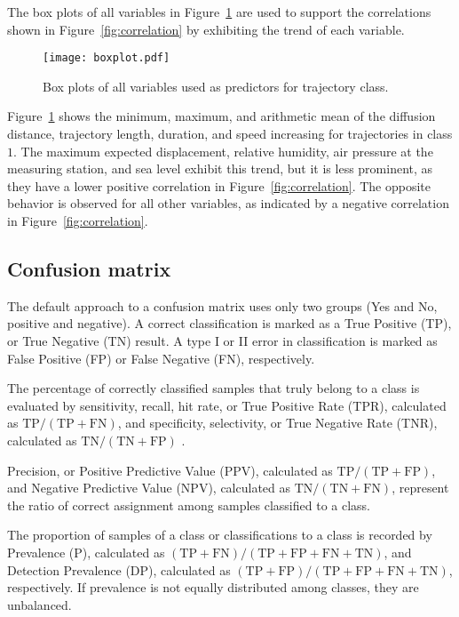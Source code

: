 \let\LaTeXcline\cline\documentclass[sn-mathphys-num]{sn-jnl}\let\cline\LaTeXcline
\begin{document}
The box plots of all variables in Figure~\ref{fig:iono3boxplot} are used to support the correlations shown in Figure~\ref{fig:correlation} by exhibiting the trend of each variable.

\begin{figure}[!ht]
    \centering
    \texttt{[image: boxplot.pdf]}
    \caption{Box plots of all variables used as predictors for trajectory class.}
    \label{fig:iono3boxplot}
\end{figure}

Figure~\ref{fig:iono3boxplot} shows the minimum, maximum, and arithmetic mean of the diffusion distance, trajectory length, duration, and speed increasing for trajectories in class $1$. The maximum expected displacement, relative humidity, air pressure at the measuring station, and sea level exhibit this trend, but it is less prominent, as they have a lower positive correlation in Figure~\ref{fig:correlation}. The opposite behavior is observed for all other variables, as indicated by a negative correlation in Figure~\ref{fig:correlation}.

\subsection{Confusion matrix}

The default approach to a confusion matrix uses only two groups (Yes and No, positive and negative). A correct classification is marked as a True Positive (TP), or True Negative (TN) result. A type I or II error in classification is marked as False Positive (FP) or False Negative (FN), respectively.

The percentage of correctly classified samples that truly belong to a class is evaluated by sensitivity, recall, hit rate, or True Positive Rate (TPR), calculated as $\mathrm{TP}/(\mathrm{TP}+\mathrm{FN})$, and specificity, selectivity, or True Negative Rate (TNR), calculated as $\mathrm{TN}/(\mathrm{TN}+\mathrm{FP})$ \cite{altman1994diagnostic1, altman1994diagnostic2}.

Precision, or Positive Predictive Value (PPV), calculated as $\mathrm{TP}/(\mathrm{TP}+\mathrm{FP})$, and Negative Predictive Value (NPV), calculated as $\mathrm{TN}/(\mathrm{TN}+\mathrm{FN})$, represent the ratio of correct assignment among samples classified to a class.

The proportion of samples of a class or classifications to a class is recorded by Prevalence (P), calculated as $(\mathrm{TP}+\mathrm{FN})/(\mathrm{TP}+\mathrm{FP}+\mathrm{FN}+\mathrm{TN})$, and Detection Prevalence (DP), calculated as $(\mathrm{TP}+\mathrm{FP})/(\mathrm{TP}+\mathrm{FP}+\mathrm{FN}+\mathrm{TN})$, respectively. If prevalence is not equally distributed among classes, they are unbalanced.
\end{document}
